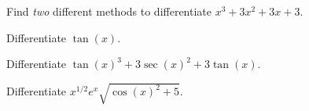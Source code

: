 \documentclass[../main.tex]{subfiles}
\begin{document}
\clearpage
\begin{example}
  Find \emph{two} different methods to differentiate \(x^{3} + 3x^{2} + 3x + 3\).
\end{example}
\vspace{2in}

\bigskip
\begin{example}
  Differentiate \(\tan(x)\). 
\end{example}

\vspace{3in}
\begin{example}
  Differentiate \(\tan(x)^{3} + 3 \sec(x)^{2} + 3\tan(x)\). 
\end{example}
\clearpage

\begin{example}
  Differentiate \(x^{1/2} e^{x} \sqrt{\cos(x)^{2} + 5}\).
\end{example}
\end{document}
